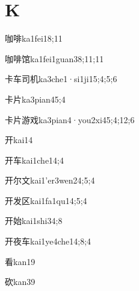 \section*{K}

\begin{verbete}{咖啡}{ka1fei1}{8;11}
\end{verbete}
\begin{verbete}{咖啡馆}{ka1fei1guan3}{8;11;11}
\end{verbete}
\begin{verbete}{卡车司机}{ka3che1·si1ji1}{5;4;5;6}
\end{verbete}
\begin{verbete}{卡片}{ka3pian4}{5;4}
\end{verbete}
\begin{verbete}{卡片游戏}{ka3pian4·you2xi4}{5;4;12;6}
\end{verbete}
\begin{verbete}{开}{kai1}{4}
\end{verbete}
\begin{verbete}{开车}{kai1che1}{4;4}
\end{verbete}
\begin{verbete}{开尔文}{kai1'er3wen2}{4;5;4}
\end{verbete}
\begin{verbete}{开发区}{kai1fa1qu1}{4;5;4}
\end{verbete}
\begin{verbete}{开始}{kai1shi3}{4;8}
\end{verbete}
\begin{verbete}{开夜车}{kai1ye4che1}{4;8;4}
\end{verbete}
\begin{verbete}{看}{kan1}{9}
\end{verbete}
\begin{verbete}{砍}{kan3}{9}
\end{verbete}
